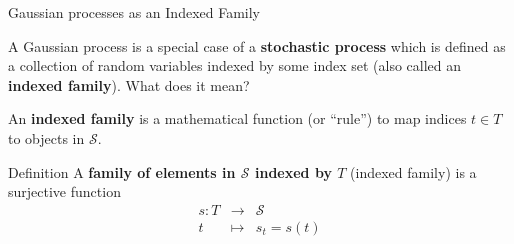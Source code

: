 \documentclass[11pt,compress,t,notes=noshow, xcolor=table]{beamer}
\begin{document}




\begin{vbframe}{Gaussian processes as an Indexed Family}



A Gaussian process is a special case of a \textbf{stochastic process} which is defined as a collection of random variables indexed by some index set (also called an \textbf{indexed family}). What does it mean? 

\lz 

An \textbf{indexed family} is a mathematical function (or \enquote{rule}) to map indices $t \in T$ to objects in $\mathcal{S}$. 

\begin{block}{Definition}
A \textbf{family of elements in $\mathcal{S}$ indexed by $T$} (indexed family) is a surjective function 
\vspace*{-0.3cm}
\begin{eqnarray*}
s: T &\to& \mathcal{S} \\
   t &\mapsto& s_t = s(t) 
\end{eqnarray*}
\end{block}

\end{vbframe}
\end{document}
